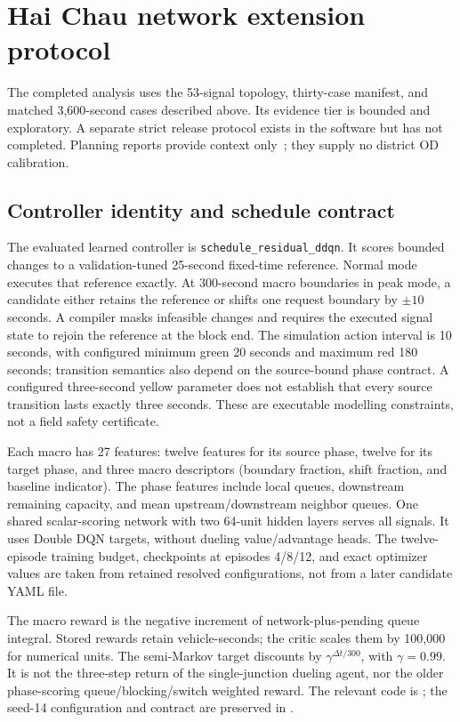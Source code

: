 \documentclass[12pt,a4paper]{report}
\begin{document}
\section{Hai Chau network extension protocol}
The completed analysis uses the 53-signal topology, thirty-case manifest, and matched 3,600-second cases described above. Its evidence tier is bounded and exploratory. A separate strict release protocol exists in the software but has not completed. Planning reports provide context only~\cite{jica2014tiensa,dacriss2010danang}; they supply no district OD calibration.

\subsection{Controller identity and schedule contract}\label{sec:residual}
The evaluated learned controller is \texttt{schedule\_residual\_ddqn}. It scores bounded changes to a validation-tuned 25-second fixed-time reference. Normal mode executes that reference exactly. At 300-second macro boundaries in peak mode, a candidate either retains the reference or shifts one request boundary by $\pm10$ seconds. A compiler masks infeasible changes and requires the executed signal state to rejoin the reference at the block end. The simulation action interval is 10 seconds, with configured minimum green 20 seconds and maximum red 180 seconds; transition semantics also depend on the source-bound phase contract. A configured three-second yellow parameter does not establish that every source transition lasts exactly three seconds. These are executable modelling constraints, not a field safety certificate.

Each macro has 27 features: twelve features for its source phase, twelve for its target phase, and three macro descriptors (boundary fraction, shift fraction, and baseline indicator). The phase features include local queues, downstream remaining capacity, and mean upstream/downstream neighbor queues. One shared scalar-scoring network with two 64-unit hidden layers serves all signals. It uses Double DQN targets, without dueling value/advantage heads. The twelve-episode training budget, checkpoints at episodes 4/8/12, and exact optimizer values are taken from retained resolved configurations, not from a later candidate YAML file.

The macro reward is the negative increment of network-plus-pending queue integral. Stored rewards retain vehicle-seconds; the critic scales them by 100,000 for numerical units. The semi-Markov target discounts by $\gamma^{\Delta t/300}$, with $\gamma=0.99$. It is not the three-step return of the single-junction dueling agent, nor the older phase-scoring queue/blocking/switch weighted reward. The relevant code is ; the seed-14 configuration and contract are preserved in .
\end{document}
